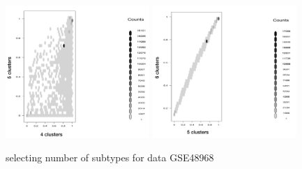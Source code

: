 \documentclass[11pt]{amsart}
\begin{document}
\begin{figure}[H]
  \includegraphics[height = 5cm, width=\linewidth]{G48_45.png}
\endminipage\hfill
{}
  \includegraphics[height = 5cm, width=\linewidth]{G48_56.png}
\endminipage\hfill
\caption{selecting number of subtypes for data GSE48968}
\end{figure}


\newpage
\appendix
\end{document}
